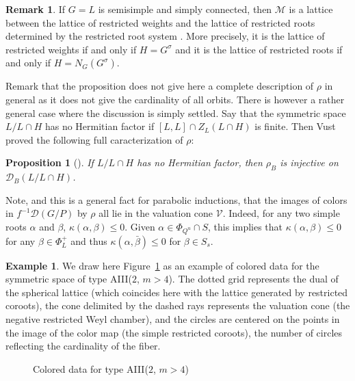 \documentclass{amsart}
\newtheorem{prop}[thm]{Proposition}
\theoremstyle{definition}
\newtheorem{rem}[thm]{Remark}
\newtheorem{exa}[thm]{Example}
\begin{document}
\begin{rem}
If $G=L$ is semisimple and simply connected, then $\mathcal{M}$ is a lattice between the lattice of restricted 
weights and the lattice of restricted roots determined by the restricted root system \cite{Vus90}.
More precisely, it is the lattice of restricted weights if and only 
if $H=G^{\sigma}$ and it is the lattice of restricted roots if and only if 
$H=N_G(G^{\sigma})$. 
\end{rem}

Remark that the proposition does not give here a complete description 
of $\rho$ in general as it does not give the cardinality of all orbits. 
There is however a rather general case where the discussion is simply 
settled. Say that the symmetric space $L/L\cap H$ has no Hermitian factor if 
$[L,L]\cap Z_L(L\cap H)$ is finite. Then Vust proved the following 
full caracterization of $\rho$:
\begin{prop}[\cite{Vus90}]
\label{prop_injective_no_hermitian}
If $L/L\cap H$ has no Hermitian factor, then $\rho_B$
is injective on $\mathcal{D}_B(L/L\cap H)$.
\end{prop}

Note, and this is a general fact for parabolic inductions, that 
the images of colors in $f^{-1}\mathcal{D}(G/P)$ by $\rho$ all 
lie in the valuation cone $\mathcal{V}$. Indeed, for any two 
simple roots $\alpha$ and $\beta$, $\kappa(\alpha,\beta)\leq 0$. 
Given $\alpha\in \Phi_{Q^u}\cap S$, this implies that 
$\kappa(\alpha,\beta)\leq 0$ for any $\beta\in \Phi_L^+$ and 
thus $\kappa(\alpha,\bar{\beta})\leq 0$ for $\beta\in S_s$.

\begin{exa}
\label{exa_colored_data_AIII}
We draw here Figure~\ref{fig_colored_data_AIII} 
as an example of colored data for the symmetric space 
of type AIII($2$, $m>4$). 
The dotted grid represents the dual of the spherical lattice (which 
coincides here with the lattice generated by restricted coroots), 
the cone delimited by the dashed rays represents the valuation cone
(the negative restricted Weyl chamber), and the circles 
are centered on the points in the image of the color map 
(the simple restricted coroots), the number 
of circles reflecting the cardinality of the fiber.
\end{exa}

\begin{figure}
\centering
\caption{Colored data for type AIII($2$, $m>4$)}
\label{fig_colored_data_AIII}
\end{figure}
\end{document}
